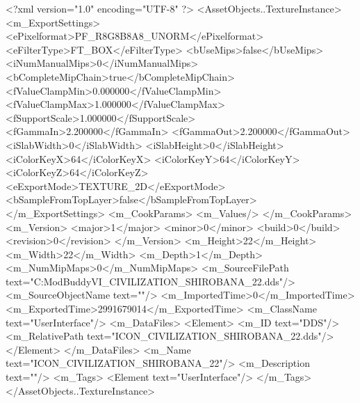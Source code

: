 <?xml version="1.0" encoding="UTF-8" ?>
<AssetObjects..TextureInstance>
	<m_ExportSettings>
		<ePixelformat>PF_R8G8B8A8_UNORM</ePixelformat>
		<eFilterType>FT_BOX</eFilterType>
		<bUseMips>false</bUseMips>
		<iNumManualMips>0</iNumManualMips>
		<bCompleteMipChain>true</bCompleteMipChain>
		<fValueClampMin>0.000000</fValueClampMin>
		<fValueClampMax>1.000000</fValueClampMax>
		<fSupportScale>1.000000</fSupportScale>
		<fGammaIn>2.200000</fGammaIn>
		<fGammaOut>2.200000</fGammaOut>
		<iSlabWidth>0</iSlabWidth>
		<iSlabHeight>0</iSlabHeight>
		<iColorKeyX>64</iColorKeyX>
		<iColorKeyY>64</iColorKeyY>
		<iColorKeyZ>64</iColorKeyZ>
		<eExportMode>TEXTURE_2D</eExportMode>
		<bSampleFromTopLayer>false</bSampleFromTopLayer>
	</m_ExportSettings>
	<m_CookParams>
		<m_Values/>
	</m_CookParams>
	<m_Version>
		<major>1</major>
		<minor>0</minor>
		<build>0</build>
		<revision>0</revision>
	</m_Version>
	<m_Height>22</m_Height>
	<m_Width>22</m_Width>
	<m_Depth>1</m_Depth>
	<m_NumMipMaps>0</m_NumMipMaps>
	<m_SourceFilePath text="C:\Users\asus\Documents\Firaxis ModBuddy\Civilization VI\temppic\ICON_CIVILIZATION_SHIROBANA_22.dds"/>
	<m_SourceObjectName text=""/>
	<m_ImportedTime>0</m_ImportedTime>
	<m_ExportedTime>2991679014</m_ExportedTime>
	<m_ClassName text="UserInterface"/>
	<m_DataFiles>
		<Element>
			<m_ID text="DDS"/>
			<m_RelativePath text="ICON_CIVILIZATION_SHIROBANA_22.dds"/>
		</Element>
	</m_DataFiles>
	<m_Name text="ICON_CIVILIZATION_SHIROBANA_22"/>
	<m_Description text=""/>
	<m_Tags>
		<Element text="UserInterface"/>
	</m_Tags>
</AssetObjects..TextureInstance>


